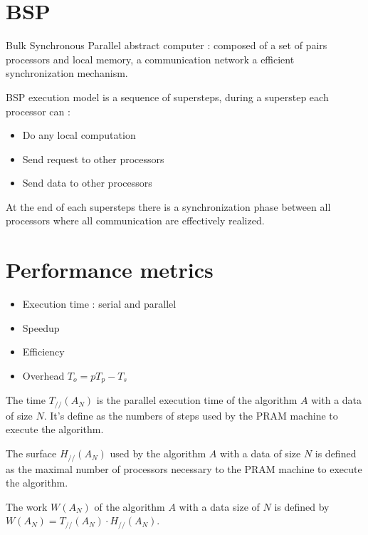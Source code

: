 \documentclass[11pt,a4paper]{report}
\begin{document}

\section{BSP} %
\label{sec:BSP}

Bulk Synchronous Parallel abstract computer : composed of a set of pairs processors and local memory, a communication network a efficient synchronization mechanism.

BSP execution model is a sequence of supersteps, during a superstep each processor can :
\begin{itemize}
    \item Do any local computation
    \item Send request to other processors
    \item Send data to other processors
\end{itemize}

At the end of each supersteps there is a synchronization phase between all processors where all communication are effectively realized.


\section{Performance metrics} %
\label{sec:Performance metrics}

\begin{itemize}
    \item Execution time : serial and parallel
    \item Speedup
    \item Efficiency
    \item Overhead $T_o = p T_p - T_s$
\end{itemize}

The time $T_{//}(A_N)$ is the parallel execution time of the algorithm $A$ with a data of size $N$. It's define as the numbers of steps used by the PRAM machine to execute the algorithm.

The surface $H_{//}(A_N)$ used by the algorithm $A$ with a data of size $N$ is defined as the maximal number of processors necessary to the PRAM machine to execute the algorithm.

The work $W(A_N)$ of the algorithm $A$ with a data size of $N$ is defined by $W(A_N)=T_{//}(A_N) \cdot H_{//}(A_N)$.

\end{document}
